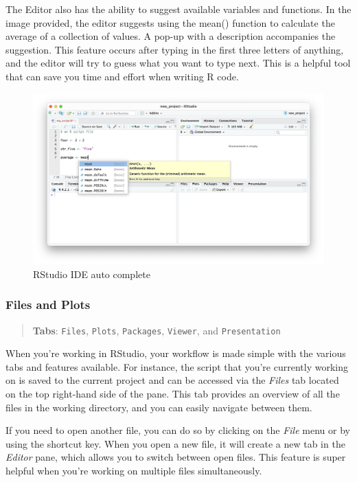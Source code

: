 \documentclass[
]{book}
\begin{document}
The Editor also has the ability to suggest available variables and functions. In the image provided, the editor suggests using the mean() function to calculate the average of a collection of values. A pop-up with a description accompanies the suggestion. This feature occurs after typing in the first three letters of anything, and the editor will try to guess what you want to type next. This is a helpful tool that can save you time and effort when writing R code.

\begin{figure}
\includegraphics[width=31.94in]{images/02_023_editor_autocomplete} \caption{\label{fig:2023}RStudio IDE auto complete}\label{fig:2023}
\end{figure}

\hypertarget{files-and-plots}{%
\subsubsection*{Files and Plots}\label{files-and-plots}}

\begin{quote}
\textbf{Tabs}: \texttt{Files}, \texttt{Plots}, \texttt{Packages}, \texttt{Viewer}, and \texttt{Presentation}
\end{quote}

When you're working in RStudio, your workflow is made simple with the various tabs and features available. For instance, the script that you're currently working on is saved to the current project and can be accessed via the \emph{Files} tab located on the top right-hand side of the pane. This tab provides an overview of all the files in the working directory, and you can easily navigate between them.

If you need to open another file, you can do so by clicking on the \emph{File} menu or by using the shortcut key. When you open a new file, it will create a new tab in the \emph{Editor} pane, which allows you to switch between open files. This feature is super helpful when you're working on multiple files simultaneously.
\end{document}
